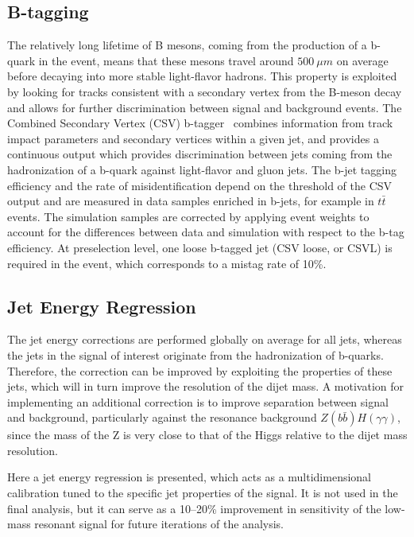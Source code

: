 \subsection{B-tagging\label{subsec:btag}}

The relatively long lifetime of B mesons, coming from the production of a b-quark in the event,
means that these mesons travel around $500~\mu m$ on average before decaying into more stable
light-flavor hadrons.
This property is exploited by looking for tracks consistent with a secondary vertex from
the B-meson decay and allows for further discrimination between signal and background events.
The Combined Secondary Vertex (CSV) b-tagger~\cite{BTV} combines
information from track impact parameters and secondary vertices within a given jet, and
provides a continuous output which provides discrimination between jets coming from the
hadronization of a b-quark against light-flavor and gluon jets.
The b-jet tagging efficiency and the rate of misidentification depend on the threshold
of the CSV output and are measured in data samples enriched in b-jets, for example in $t\bar{t}$ events.
The simulation samples are corrected by applying event weights to account for the
differences between data and simulation with respect to the b-tag efficiency.
At preselection level, one loose b-tagged jet (CSV loose, or CSVL)
is required in the event, which corresponds to a mistag rate of 10\%.

\subsection{Jet Energy Regression}

The jet energy corrections are performed globally on average for all jets, whereas the jets in
the signal of interest originate from the hadronization of b-quarks. Therefore, the correction
can be improved by exploiting the properties of these jets, which will in turn improve the resolution
of the dijet mass. A motivation for implementing an additional correction is to improve separation
between signal and background, particularly against
the resonance background $Z(b\bar{b})H(\gamma\gamma)$,
since the mass of the Z is very close to that of the Higgs relative to the dijet mass resolution.

Here a jet energy regression is presented, which acts as a multidimensional calibration tuned to the
specific jet properties of the signal. It is not used in the final analysis, but it can serve
as a 10--20\% improvement in sensitivity of the low-mass resonant signal
for future iterations of the analysis.

